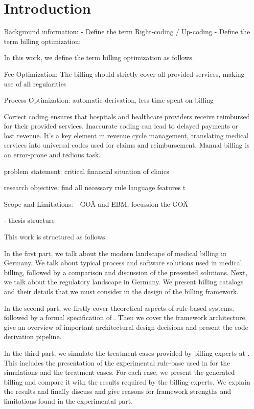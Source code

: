 \chapter{Introduction}\label{ch:introduction}


Background information:
- Define the term Right-coding / Up-coding
- Define the term billing optimization:

In this work, we define the term billing optimization as follows.
\begin{description}
    \item Fee Optimization: The billing should strictly cover all provided services, making use of all regularities
    \item Process Optimization: automatic derivation, less time spent on billing
\end{description}
Correct coding ensures that hospitals and healthcare providers receive reimbursed for their provided services.
Inaccurate coding can lead to delayed payments or lost revenue.
It's a key element in revenue cycle management, translating medical services into universal codes used for claims and reimbursement.
Manual billing is an error-prone and tedious task.


problem statement: critical financial situation of clinics

research objective:
find all necessary rule language features t



Scope and Limitations:
- GOÄ and EBM, focussion the GOÄ

- thesis structure

This work is structured as follows.

In the first part, we talk about the modern landscape of medical billing in Germany.
We talk about typical process and software solutions used in medical billing, followed by a comparison and discussion of the presented solutions.
Next, we talk about the regulatory landscape in Germany.
We present billing catalogs and their details that we must consider in the design of the billing framework.

In the second part, we firstly cover theoretical aspects of rule-based systems, followed by a formal specification of \RL.
Then we cover the framework architecture, give an overview of important architectural design decisions and present the code derivation pipeline.

In the third part, we simulate the treatment cases provided by billing experts at \AV.
This includes the presentation of the experimental rule-base used in for the simulations and the treatment cases.
For each case, we present the generated billing and compare it with the results required by the billing experts.
We explain the results and finally discuss and give reasons for framework strengths and limitations found in the experimental part.

